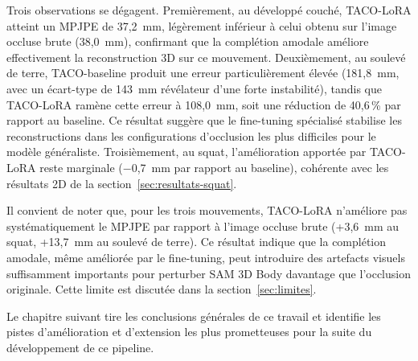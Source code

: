 Trois observations se dégagent. Premièrement, au développé couché, TACO-LoRA atteint un MPJPE de 37,2~mm, légèrement inférieur à celui obtenu sur l'image occluse brute (38,0~mm), confirmant que la complétion amodale améliore effectivement la reconstruction 3D sur ce mouvement. Deuxièmement, au soulevé de terre, TACO-baseline produit une erreur particulièrement élevée (181,8~mm, avec un écart-type de 143~mm révélateur d'une forte instabilité), tandis que TACO-LoRA ramène cette erreur à 108,0~mm, soit une réduction de 40,6\,\% par rapport au baseline. Ce résultat suggère que le fine-tuning spécialisé stabilise les reconstructions dans les configurations d'occlusion les plus difficiles pour le modèle généraliste. Troisièmement, au squat, l'amélioration apportée par TACO-LoRA reste marginale ($-$0,7~mm par rapport au baseline), cohérente avec les résultats 2D de la section~\ref{sec:resultats-squat}.

Il convient de noter que, pour les trois mouvements, TACO-LoRA n'améliore pas systématiquement le MPJPE par rapport à l'image occluse brute (+3,6~mm au squat, +13,7~mm au soulevé de terre). Ce résultat indique que la complétion amodale, même améliorée par le fine-tuning, peut introduire des artefacts visuels suffisamment importants pour perturber SAM 3D Body davantage que l'occlusion originale. Cette limite est discutée dans la section~\ref{sec:limites}.

\medskip
Le chapitre suivant tire les conclusions générales de ce travail et identifie les pistes d'amélioration et d'extension les plus prometteuses pour la suite du développement de ce pipeline.